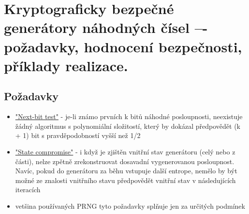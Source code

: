 \clearpage
\section{Kryptograficky bezpečné generátory náhodných čísel –- požadavky, hodnocení bezpečnosti, příklady realizace.}
\subsection{Požadavky}
\begin{itemize}
    \item \uline{"Next-bit test"} - je-li známo prvních k bitů náhodné posloupnosti, neexistuje žádný algoritmus s polynomiální složitostí, který by dokázal předpovědět (k + 1) bit s pravděpodobností vyšší než 1/2
    \item \uline{"State compromise"} - i když je zjištěn vnitřní stav generátoru (celý nebo z části), nelze zpětně zrekonstruovat dosavadní vygenerovanou posloupnost. Navíc, pokud do generátoru za běhu vstupuje další entrope, nemělo by být možné ze znalosti vnitřního stavu předpovědět vnitřní stav v následujících iteracích
    \item vetšina používaných PRNG tyto požadavky splňuje jen za určitých podmínek
\end{itemize}

